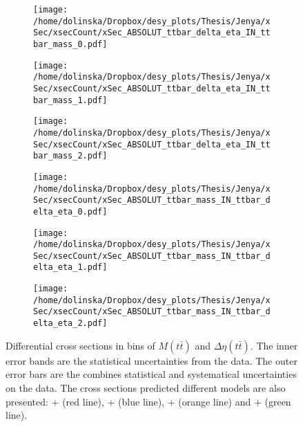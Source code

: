 \begin{sidewaysfigure}[p]
\centering
\begin{subfigure}
  \centering
  \texttt{[image: /home/dolinska/Dropbox/desy\_plots/Thesis/Jenya/xSec/xsecCount/xSec\_ABSOLUT\_ttbar\_delta\_eta\_IN\_ttbar\_mass\_0.pdf]}
\end{subfigure}
\begin{subfigure}
  \centering
  \texttt{[image: /home/dolinska/Dropbox/desy\_plots/Thesis/Jenya/xSec/xsecCount/xSec\_ABSOLUT\_ttbar\_delta\_eta\_IN\_ttbar\_mass\_1.pdf]}
\end{subfigure}
\begin{subfigure}
  \centering
  \texttt{[image: /home/dolinska/Dropbox/desy\_plots/Thesis/Jenya/xSec/xsecCount/xSec\_ABSOLUT\_ttbar\_delta\_eta\_IN\_ttbar\_mass\_2.pdf]}
\end{subfigure}
\begin{subfigure}
  \centering
  \texttt{[image: /home/dolinska/Dropbox/desy\_plots/Thesis/Jenya/xSec/xsecCount/xSec\_ABSOLUT\_ttbar\_mass\_IN\_ttbar\_delta\_eta\_0.pdf]}
\end{subfigure}
\begin{subfigure}
  \centering
  \texttt{[image: /home/dolinska/Dropbox/desy\_plots/Thesis/Jenya/xSec/xsecCount/xSec\_ABSOLUT\_ttbar\_mass\_IN\_ttbar\_delta\_eta\_1.pdf]}
\end{subfigure}
\begin{subfigure}
  \centering
  \texttt{[image: /home/dolinska/Dropbox/desy\_plots/Thesis/Jenya/xSec/xsecCount/xSec\_ABSOLUT\_ttbar\_mass\_IN\_ttbar\_delta\_eta\_2.pdf]}
\end{subfigure}
\caption{Differential cross sections in bins of $M(t\bar{t})$ and $\Delta\eta(t\bar{t})$. The inner error bands are the statistical uncertainties from the data.
         The outer error bars are the combines statistical and systematical uncertainties on the data. The cross sections predicted different models are also presented:
         \MG + \PYTHIA (red line), \Powheg + \PYTHIA (blue line), \Powheg + \HERWIG (orange line) and \MCNLO + \HERWIG (green line).}
\label{fig:XSU_2D_eta_Mtt}
\end{sidewaysfigure}

